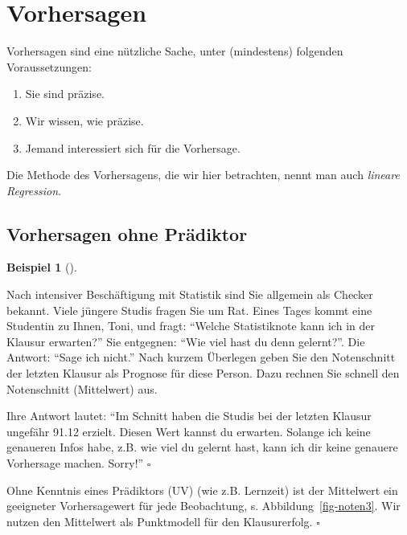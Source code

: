 \documentclass[
  letterpaper,
  twoside,
  open=any]{scrbook}
\providecommand{\tightlist}{%
  \setlength{\itemsep}{0pt}\setlength{\parskip}{0pt}}\usepackage{longtable,booktabs,array}
\theoremstyle{definition}
\theoremstyle{definition}
\theoremstyle{definition}
\newtheorem{example}{Beispiel}[chapter]
\theoremstyle{remark}
\begin{document}
\section{Vorhersagen}\label{vorhersagen}

Vorhersagen sind eine nützliche Sache, unter (mindestens) folgenden
Voraussetzungen:

\begin{enumerate}
\def\labelenumi{\arabic{enumi}.}
\tightlist
\item
  Sie sind präzise.
\item
  Wir wissen, wie präzise.
\item
  Jemand interessiert sich für die Vorhersage.
\end{enumerate}

Die Methode des Vorhersagens, die wir hier betrachten, nennt man auch
\emph{lineare Regression}.

\subsection{Vorhersagen ohne
Prädiktor}\label{vorhersagen-ohne-pruxe4diktor}

\begin{example}[]\protect\hypertarget{exm-noten-prognose}{}\label{exm-noten-prognose}

Nach intensiver Beschäftigung mit Statistik sind Sie allgemein als
Checker bekannt. Viele jüngere Studis fragen Sie um Rat. Eines Tages
kommt eine Studentin zu Ihnen, Toni, und fragt: \enquote{Welche
Statistiknote kann ich in der Klausur erwarten?} Sie entgegnen:
\enquote{Wie viel hast du denn gelernt?}. Die Antwort: \enquote{Sage ich
nicht.} Nach kurzem Überlegen geben Sie den Notenschnitt der letzten
Klausur als Prognose für diese Person. Dazu rechnen Sie schnell den
Notenschnitt (Mittelwert) aus.

Ihre Antwort lautet: \enquote{Im Schnitt haben die Studis bei der
letzten Klausur ungefähr 91.12 erzielt. Diesen Wert kannst du erwarten.
Solange ich keine genaueren Infos habe, z.B. wie viel du gelernt hast,
kann ich dir keine genauere Vorhersage machen. Sorry!} \(\square\)

\end{example}

Ohne Kenntnis eines Prädiktors (UV) (wie z.B. Lernzeit) ist der
Mittelwert ein geeigneter Vorhersagewert für jede Beobachtung, s.
Abbildung~\ref{fig-noten3}. Wir nutzen den Mittelwert als Punktmodell
für den Klausurerfolg. \(\square\)
\end{document}
